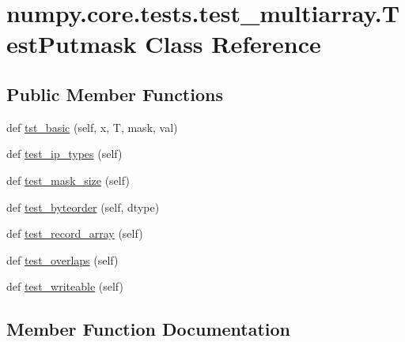 \hypertarget{classnumpy_1_1core_1_1tests_1_1test__multiarray_1_1TestPutmask}{}\section{numpy.\+core.\+tests.\+test\+\_\+multiarray.\+Test\+Putmask Class Reference}
\label{classnumpy_1_1core_1_1tests_1_1test__multiarray_1_1TestPutmask}
\subsection*{Public Member Functions}
\begin{DoxyCompactItemize}
\item 
def \hyperlink{classnumpy_1_1core_1_1tests_1_1test__multiarray_1_1TestPutmask_ae72e120f3c05c6c431e35d19aee3c898}{tst\+\_\+basic} (self, x, T, mask, val)
\item 
def \hyperlink{classnumpy_1_1core_1_1tests_1_1test__multiarray_1_1TestPutmask_a953d8e52357c227b4ebed4afbe135d2a}{test\+\_\+ip\+\_\+types} (self)
\item 
def \hyperlink{classnumpy_1_1core_1_1tests_1_1test__multiarray_1_1TestPutmask_a97004a2c54bb7d2943a149fe64ab9d3c}{test\+\_\+mask\+\_\+size} (self)
\item 
def \hyperlink{classnumpy_1_1core_1_1tests_1_1test__multiarray_1_1TestPutmask_a0d560b1dbe059d3606ea0b671f761dc1}{test\+\_\+byteorder} (self, dtype)
\item 
def \hyperlink{classnumpy_1_1core_1_1tests_1_1test__multiarray_1_1TestPutmask_a85583cde67097a02176bcc5753963d0f}{test\+\_\+record\+\_\+array} (self)
\item 
def \hyperlink{classnumpy_1_1core_1_1tests_1_1test__multiarray_1_1TestPutmask_aa831b1e472be2a43aa7db4ca575f892d}{test\+\_\+overlaps} (self)
\item 
def \hyperlink{classnumpy_1_1core_1_1tests_1_1test__multiarray_1_1TestPutmask_a75973cf9ca0b779576455eb73b52bc04}{test\+\_\+writeable} (self)
\end{DoxyCompactItemize}


\subsection{Member Function Documentation}
\mbox{\label{classnumpy_1_1core_1_1tests_1_1test__multiarray_1_1TestPutmask_a0d560b1dbe059d3606ea0b671f761dc1}} 
